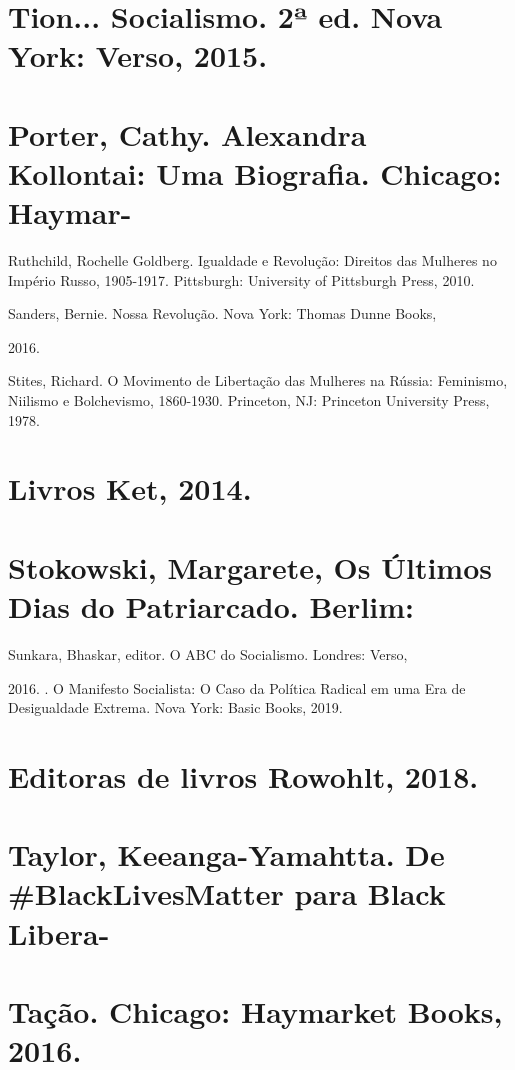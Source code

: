 \section{Tion... Socialismo. 2ª ed. Nova York: Verso, 2015.}
 \par 
\section{Porter, Cathy. Alexandra Kollontai: Uma Biografia. Chicago: Haymar-}
 \par 
Ruthchild, Rochelle Goldberg. Igualdade e Revolução: Direitos das Mulheres no Império Russo, 1905-1917. Pittsburgh: University of Pittsburgh Press, 2010.
 \par 
Sanders, Bernie. Nossa Revolução. Nova York: Thomas Dunne Books,
 \par 
2016.
 \par 
Stites, Richard. O Movimento de Libertação das Mulheres na Rússia: Feminismo, Niilismo e Bolchevismo, 1860-1930. Princeton, NJ: Princeton University Press, 1978.
 \par 
\section{Livros Ket, 2014.}
 \par 
\section{Stokowski, Margarete, Os Últimos Dias do Patriarcado. Berlim:}
 \par 
Sunkara, Bhaskar, editor. O ABC do Socialismo. Londres: Verso,
 \par 
2016. . O Manifesto Socialista: O Caso da Política Radical em uma Era de Desigualdade Extrema. Nova York: Basic Books, 2019.
 \par 
\section{Editoras de livros Rowohlt, 2018.}
 \par 
\section{Taylor, Keeanga-Yamahtta. De #BlackLivesMatter para Black Libera-}
 \par 
\section{Tação. Chicago: Haymarket Books, 2016.}
 \par 
